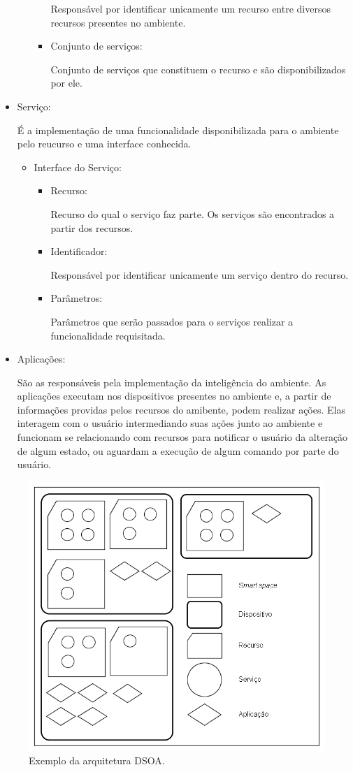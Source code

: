\begin{itemize}
\begin{itemize}
\begin{itemize}
						Responsável por identificar unicamente um recurso entre diversos recursos presentes no ambiente.
					\item Conjunto de serviços:

						Conjunto de serviços que constituem o recurso e são disponibilizados por ele.
				\end{itemize}
		\end{itemize}
	\item Serviço:

		É a implementação de uma funcionalidade disponibilizada para o ambiente pelo reucurso e uma interface conhecida.
		\begin{itemize}
			\item Interface do Serviço:
			\begin{itemize}
				\item Recurso:

					Recurso do qual o serviço faz parte. Os serviços são encontrados a partir dos recursos.
				\item Identificador:

					Responsável por identificar unicamente um serviço dentro do recurso.
				\item Parâmetros:

					Parâmetros que serão passados para o serviços realizar a funcionalidade requisitada.
			\end{itemize}
		\end{itemize}
	\item Aplicações:
	
		São as responsáveis pela implementação da inteligência do ambiente. As aplicações executam nos dispositivos presentes no ambiente e, a partir de informações providas pelos recursos do amibente, podem realizar ações. Elas interagem com o usuário intermediando suas ações junto ao ambiente e funcionam se relacionando com recursos para notificar o usuário da alteração de algum estado, ou aguardam a execução de algum comando por parte do usuário.
\end{itemize}

\begin{figure}[ht]
	\center
	\includegraphics[scale=0.6]{imagens/arquiteturaDSOA}
	\caption{Exemplo da arquitetura DSOA.}
	\label{fig:arquiteturaDSOA}
\end{figure}